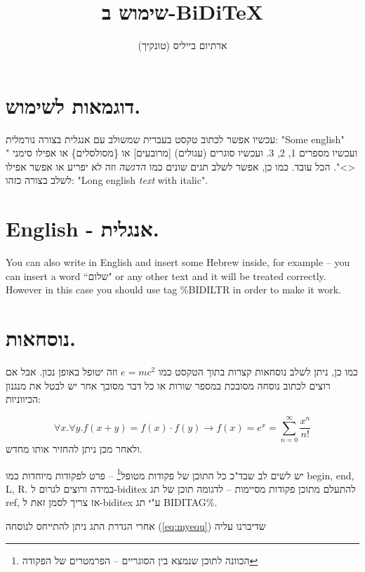 \documentclass{article}
\title{שימוש ב-BiDiTeX}
\author{ארתיום בייליס (טונקיך)}
\begin{document}
\maketitle
\section{דוגמאות לשימוש.}
עכשיו אפשר לכתוב טקסט בעברית שמשולב עם אנגלית בצורה נורמלית: "Some english" ועכשיו מספרים 1, 2, 3. ועכשיו סוגרים (עגולים) [מרובעים] או \{מסולסלים\} או אפילו סימני "<>". הכל עובד. כמו כן, אפשר לשלב תגים שונים כמו \emph{הדגשה} וזה לא יפריע או אפשר אפילו לשלב בצורה כזהו: "Long english \emph{text} with italic".

\unsethebrew
\section{English - אנגלית.}

You can also write in English and insert some Hebrew inside, for example -- you can insert a word ``שלום" or any other text and it will be treated correctly. However in this case you should use tag \%BIDILTR in order to make it work.

\sethebrew
\section{נוסחאות.}
כמו כן, ניתן לשלב נוסחאות קצרות בתוך הטקסט כמו $e=mc^2$ וזה יטופל באופן נכון. אבל אם רוצים לכתוב נוסחה מסובכת במספר שורות או כל דבר מסובך אחר יש לבטל את מנגנון הכיווניות:

\begin{equation} \label{eq:myequ}
\forall{x}.\forall{y}.f(x+y)=f(x) \cdot f(y)  \to 
f(x)=e^x=\sum^{\infty}_{n=0}{\frac{x^n}{n!}}
\end{equation}
ולאחר מכן ניתן להחזיר אותו מחדש.

יש לשים לב שבד"כ כל התוכן של פקודות מטופל\footnote{הכוונה לתוכן שנמצא בין הסוגריים -- הפרמטרים של הפקודה} -- פרט לפקודות מיוחדות כמו begin, end, L, R. במידה ורוצים לגרום ל-biditex להתעלם מתוכן פקודות מסיימות -- לדגומה תוכן של תג ref, אז צריך לסמן זאת ל-biditex ע"י תג BIDITAG\%.



אחרי הגדרת התג ניתן להתייחס לנוסחה (\ref{eq:myequ}) שדיברנו עליה
\end{document}

